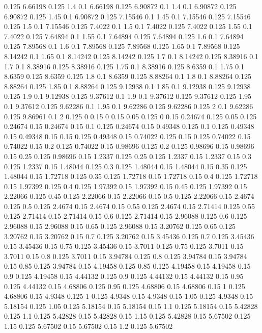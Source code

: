 0.125 6.66198
0.125 1.4
0.1 6.66198
0.125 6.90872
0.1 1.4
0.1 6.90872
0.125 6.90872
0.125 1.45
0.1 6.90872
0.125 7.15546
0.1 1.45
0.1 7.15546
0.125 7.15546
0.125 1.5
0.1 7.15546
0.125 7.4022
0.1 1.5
0.1 7.4022
0.125 7.4022
0.125 1.55
0.1 7.4022
0.125 7.64894
0.1 1.55
0.1 7.64894
0.125 7.64894
0.125 1.6
0.1 7.64894
0.125 7.89568
0.1 1.6
0.1 7.89568
0.125 7.89568
0.125 1.65
0.1 7.89568
0.125 8.14242
0.1 1.65
0.1 8.14242
0.125 8.14242
0.125 1.7
0.1 8.14242
0.125 8.38916
0.1 1.7
0.1 8.38916
0.125 8.38916
0.125 1.75
0.1 8.38916
0.125 8.6359
0.1 1.75
0.1 8.6359
0.125 8.6359
0.125 1.8
0.1 8.6359
0.125 8.88264
0.1 1.8
0.1 8.88264
0.125 8.88264
0.125 1.85
0.1 8.88264
0.125 9.12938
0.1 1.85
0.1 9.12938
0.125 9.12938
0.125 1.9
0.1 9.12938
0.125 9.37612
0.1 1.9
0.1 9.37612
0.125 9.37612
0.125 1.95
0.1 9.37612
0.125 9.62286
0.1 1.95
0.1 9.62286
0.125 9.62286
0.125 2
0.1 9.62286
0.125 9.86961
0.1 2
0.125 0
0.15 0
0.15 0.05
0.125 0
0.15 0.24674
0.125 0.05
0.125 0.24674
0.15 0.24674
0.15 0.1
0.125 0.24674
0.15 0.49348
0.125 0.1
0.125 0.49348
0.15 0.49348
0.15 0.15
0.125 0.49348
0.15 0.74022
0.125 0.15
0.125 0.74022
0.15 0.74022
0.15 0.2
0.125 0.74022
0.15 0.98696
0.125 0.2
0.125 0.98696
0.15 0.98696
0.15 0.25
0.125 0.98696
0.15 1.2337
0.125 0.25
0.125 1.2337
0.15 1.2337
0.15 0.3
0.125 1.2337
0.15 1.48044
0.125 0.3
0.125 1.48044
0.15 1.48044
0.15 0.35
0.125 1.48044
0.15 1.72718
0.125 0.35
0.125 1.72718
0.15 1.72718
0.15 0.4
0.125 1.72718
0.15 1.97392
0.125 0.4
0.125 1.97392
0.15 1.97392
0.15 0.45
0.125 1.97392
0.15 2.22066
0.125 0.45
0.125 2.22066
0.15 2.22066
0.15 0.5
0.125 2.22066
0.15 2.4674
0.125 0.5
0.125 2.4674
0.15 2.4674
0.15 0.55
0.125 2.4674
0.15 2.71414
0.125 0.55
0.125 2.71414
0.15 2.71414
0.15 0.6
0.125 2.71414
0.15 2.96088
0.125 0.6
0.125 2.96088
0.15 2.96088
0.15 0.65
0.125 2.96088
0.15 3.20762
0.125 0.65
0.125 3.20762
0.15 3.20762
0.15 0.7
0.125 3.20762
0.15 3.45436
0.125 0.7
0.125 3.45436
0.15 3.45436
0.15 0.75
0.125 3.45436
0.15 3.7011
0.125 0.75
0.125 3.7011
0.15 3.7011
0.15 0.8
0.125 3.7011
0.15 3.94784
0.125 0.8
0.125 3.94784
0.15 3.94784
0.15 0.85
0.125 3.94784
0.15 4.19458
0.125 0.85
0.125 4.19458
0.15 4.19458
0.15 0.9
0.125 4.19458
0.15 4.44132
0.125 0.9
0.125 4.44132
0.15 4.44132
0.15 0.95
0.125 4.44132
0.15 4.68806
0.125 0.95
0.125 4.68806
0.15 4.68806
0.15 1
0.125 4.68806
0.15 4.9348
0.125 1
0.125 4.9348
0.15 4.9348
0.15 1.05
0.125 4.9348
0.15 5.18154
0.125 1.05
0.125 5.18154
0.15 5.18154
0.15 1.1
0.125 5.18154
0.15 5.42828
0.125 1.1
0.125 5.42828
0.15 5.42828
0.15 1.15
0.125 5.42828
0.15 5.67502
0.125 1.15
0.125 5.67502
0.15 5.67502
0.15 1.2
0.125 5.67502

